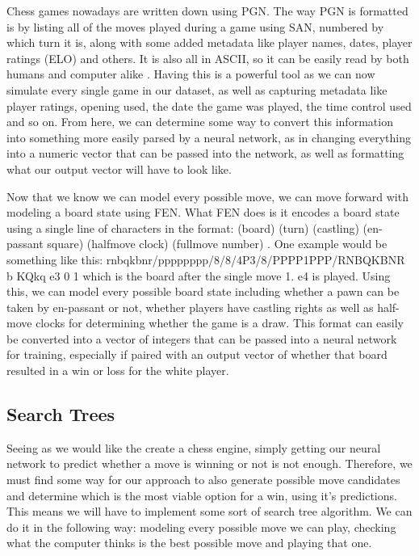 \documentclass[12pt]{article}
\begin{document}
    Chess games nowadays are written down using PGN. The way PGN is formatted is by listing all of the moves played during a game using SAN, numbered by which turn it is, along with some added metadata like player names, dates, player ratings (ELO) and others. It is also all in ASCII, so it can be easily read by both humans and computer alike \cite{pgnrules}. Having this is a powerful tool as we can now simulate every single game in our dataset, as well as capturing metadata like player ratings, opening used, the date the game was played, the time control used and so on. From here, we can determine some way to convert this information into something more easily parsed by a neural network, as in changing everything into a numeric vector that can be passed into the network, as well as formatting what our output vector will have to look like.

    Now that we know we can model every possible move, we can move forward with modeling a board state using FEN. What FEN does is it encodes a board state using a single line of characters in the format: (board) (turn) (castling) (en-passant square) (halfmove clock) (fullmove number) \cite{pgnrules}. One example would be something like this: rnbqkbnr/pppppppp/8/8/4P3/8/PPPP1PPP/RNBQKBNR b KQkq e3 0 1 which is the board after the single move 1. e4 is played. Using this, we can model every possible board state including whether a pawn can be taken by en-passant or not, whether players have castling rights as well as half-move clocks for determining whether the game is a draw. This format can easily be converted into a vector of integers that can be passed into a neural network for training, especially if paired with an output vector of whether that board resulted in a win or loss for the white player. 

    \subsection{Search Trees}

    Seeing as we would like the create a chess engine, simply getting our neural network to predict whether a move is winning or not is not enough. Therefore, we must find some way for our approach to also generate possible move candidates and determine which is the most viable option for a win, using it's predictions. This means we will have to implement some sort of search tree algorithm. We can do it in the following way: modeling every possible move we can play, checking what the computer thinks is the best possible move and playing that one. 
\end{document}
